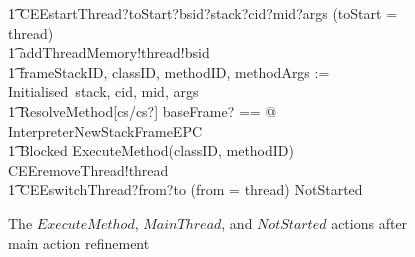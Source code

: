 \begin{figure}[t!]
\begin{circusaction}
    \t1 CEEstartThread?toStart?bsid?stack?cid?mid?args \prefixcolon (toStart = thread) \then {} \\
    \t1 addThreadMemory!thread!bsid \then {} \\
    \t1 frameStackID, classID, methodID, methodArgs := Initialised~stack, cid, mid, args \circseq \\
    \t1 \lschexpract ResolveMethod[cs/cs?] \rschexpract \circseq \lschexpract \exists baseFrame? == \true @ InterpreterNewStackFrameEPC \rschexpract \circseq \\
    \t1 Blocked \circseq ExecuteMethod(classID, methodID) \circseq CEEremoveThread!thread \then {} \\
    \t1 CEEswitchThread?from?to \prefixcolon (from = thread) \then NotStarted
  \end{circusaction}
  \caption{The $ExecuteMethod$, $MainThread$, and $NotStarted$ actions
    after main action refinement}
  \label{refine-main-actions-example-figure}
\end{figure}

